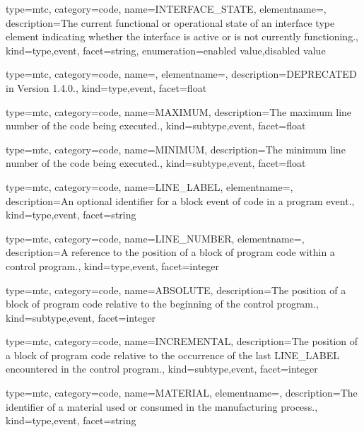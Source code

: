 {
  type=mtc,
  category=code,
  name={INTERFACE\_STATE},
  elementname=,
  description={The current functional or operational state of an \gls{interface} type element indicating whether the interface is active or is not currently functioning.},
  kind={type,event},
  facet={\gls{string}},
  enumeration={\gls{enabled value},\gls{disabled value}}
}


{
  type=mtc,
  category=code,
  name=,
  elementname=,
  description={DEPRECATED in Version 1.4.0.},
  kind={type,event},
  facet={\gls{float}}
}


{
  type=mtc,
  category=code,
  name={MAXIMUM},
  description={The maximum line number of the code being executed.},
  kind={subtype,event},
  facet={\gls{float}}
}


{
  type=mtc,
  category=code,
  name={MINIMUM},
  description={The minimum line number of the code being executed.},
  kind={subtype,event},
  facet={\gls{float}}
}


{
  type=mtc,
  category=code,
  name={LINE\_LABEL},
  elementname=,
  description={An optional identifier for a \gls{block event} of code in a \gls{program event}.},
  kind={type,event},
  facet={\gls{string}}
}


{
  type=mtc,
  category=code,
  name={LINE\_NUMBER},
  elementname=,
  description={A reference to the position of a block of program code within a control program.},
  kind={type,event},
  facet={\gls{integer}}
}


{
  type=mtc,
  category=code,
  name={ABSOLUTE},
  description={The position of a block of program code relative to the beginning of the control program.},
  kind={subtype,event},
  facet={\gls{integer}}
}


{
  type=mtc,
  category=code,
  name={INCREMENTAL},
  description={The position of a block of program code relative to the occurrence of the last LINE\_LABEL encountered in the control program.},
  kind={subtype,event},
  facet={\gls{integer}}
}


{
  type=mtc,
  category=code,
  name={MATERIAL},
  elementname=,
  description={The identifier of a material used or consumed in the manufacturing process.},
  kind={type,event},
  facet={\gls{string}}
}


